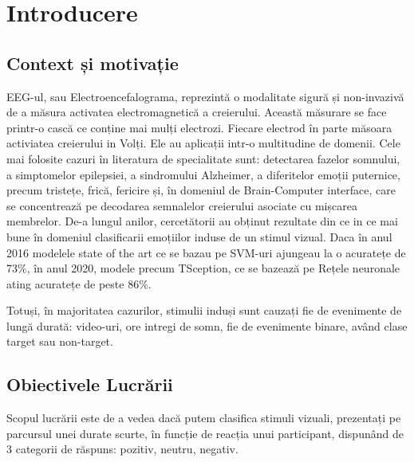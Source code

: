 \chapter{Introducere}

\section{Context și motivație}
EEG-ul, sau Electroencefalograma, reprezintă o modalitate sigură și non-invazivă de a măsura activatea electromagnetică a creierului. Această măsurare se face printr-o cască ce conține mai mulți electrozi. Fiecare electrod în parte măsoara activiatea creierului in Volți. Ele au aplicații intr-o multitudine de domenii. Cele mai folosite cazuri în literatura de specialitate sunt: detectarea fazelor somnului, a simptomelor epilepsiei, a sindromului Alzheimer, a diferitelor emoții puternice, precum tristețe, frică, fericire și, în domeniul de Brain-Computer interface, care se concentrează pe decodarea semnalelor creierului asociate cu mișcarea membrelor.
De-a lungul anilor, cercetătorii au obținut rezultate din ce in ce mai bune în domeniul clasificarii emoțiilor induse de un stimul vizual. Daca în anul 2016 modelele state of the art ce se bazau pe SVM-uri ajungeau la o acuratețe de 73\%\cite{ATKINSON201635}, în anul 2020, modele precum TSception, ce se bazează pe Rețele neuronale ating acuratețe de peste 86\%\cite{TSception}. 

Totuși, în majoritatea cazurilor, stimulii induși sunt cauzați fie de evenimente de lungă durată: video-uri, ore intregi de somn, fie de evenimente binare, având clase target sau non-target.

\section{Obiectivele Lucrării}
Scopul lucrării este de a vedea dacă putem clasifica stimuli vizuali, prezentați pe parcursul unei durate scurte, în funcție de reacția unui participant, dispunând de 3 categorii de răspuns: pozitiv, neutru, negativ.
